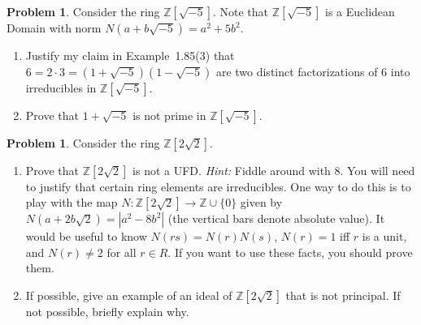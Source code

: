\documentclass[11pt]{scrartcl}
\theoremstyle{definition}
\newtheorem{problem}[theorem]{Problem}
\begin{document}
\begin{problem}
Consider the ring $\mathbb{Z}[\sqrt{-5}]$. Note that $\mathbb{Z}[\sqrt{-5}]$ is a Euclidean Domain with norm $N(a+b\sqrt{-5})=a^2+5b^2$.  
\begin{enumerate}[label=\rm{(\alph*)}]
\item Justify my claim in Example~1.85(3) that $6=2\cdot 3=(1+\sqrt{-5})(1-\sqrt{-5})$ are two distinct factorizations of 6 into irreducibles in $\mathbb{Z}[\sqrt{-5}]$.
\item Prove that $1+\sqrt{-5}$ is not prime in $\mathbb{Z}[\sqrt{-5}]$.
\end{enumerate}
\end{problem}

\begin{problem}
Consider the ring $\mathbb{Z}[2\sqrt{2}]$.
\begin{enumerate}[label=\rm{(\alph*)}]
\item Prove that $\mathbb{Z}[2\sqrt{2}]$ is not a UFD. \emph{Hint:} Fiddle around with 8.  You will need to justify that certain ring elements are irreducibles.  One way to do this is to play with the map $N:\mathbb{Z}[2\sqrt{2}]\to \mathbb{Z}\cup\{0\}$ given by $N(a+2b\sqrt{2})=|a^2-8b^2|$ (the vertical bars denote absolute value). It would be useful to know $N(rs)=N(r)N(s)$, $N(r)=1$ iff $r$ is a unit, and $N(r)\neq 2$ for all $r\in R$. If you want to use these facts, you should prove them.
\item If possible, give an example of an ideal of $\mathbb{Z}[2\sqrt{2}]$ that is not principal.  If not possible, briefly explain why.
\end{enumerate}
\end{problem}
\end{document}
